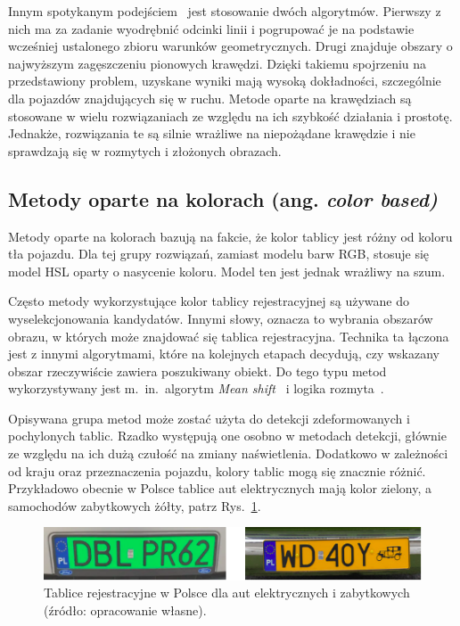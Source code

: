 Innym spotykanym podejściem~\cite{4410602} jest stosowanie dwóch algorytmów.
Pierwszy z nich ma za zadanie wyodrębnić odcinki linii i pogrupować je na podstawie wcześniej ustalonego zbioru warunków geometrycznych.
Drugi znajduje obszary o najwyższym zagęszczeniu pionowych krawędzi.
Dzięki takiemu spojrzeniu na przedstawiony problem, uzyskane wyniki mają wysoką dokładności, szczególnie dla pojazdów znajdujących się \linebreak w ruchu.
Metode oparte na krawędziach są stosowane w wielu rozwiązaniach ze względu na ich szybkość działania i prostotę.
Jednakże, rozwiązania te są silnie wrażliwe na niepożądane krawędzie i nie sprawdzają się w rozmytych i złożonych obrazach.

\subsection{Metody oparte na kolorach (ang. \textit{color based)}}
\label{subsec:color-based}
Metody oparte na kolorach bazują na fakcie, że kolor tablicy jest różny od koloru tła pojazdu.
Dla tej grupy rozwiązań, zamiast modelu barw RGB, stosuje się model HSL oparty o nasycenie koloru.
Model ten jest jednak wrażliwy na szum.

Często metody wykorzystujące kolor tablicy rejestracyjnej są używane do wyselekcjonowania kandydatów.
Innymi słowy, oznacza to wybrania obszarów obrazu, w których może znajdować się tablica rejestracyjna.
Technika ta łączona jest z innymi algorytmami, które na kolejnych etapach decydują, czy wskazany obszar rzeczywiście zawiera poszukiwany obiekt.
Do tego typu metod wykorzystywany jest m.\ in.\ algorytm \textit{Mean shift}~\cite{1520110} i logika rozmyta~\cite{Wang2008FuzzybasedAF}.

Opisywana grupa metod może zostać użyta do detekcji zdeformowanych i pochylonych tablic.
Rzadko występują one osobno w metodach detekcji, głównie ze względu na ich dużą czułość na zmiany naświetlenia.
Dodatkowo w zależności od kraju oraz przeznaczenia pojazdu, kolory tablic mogą się znacznie różnić.
Przykładowo obecnie w Polsce tablice aut elektrycznych mają kolor zielony, a samochodów zabytkowych żółty, patrz Rys.~\ref{fig:tablice}.
\FloatBarrier
\begin{figure}[!ht]
    \centering
    \includegraphics[scale=0.6]{Pictures/tablice}
    \caption{Tablice rejestracyjne w Polsce dla aut elektrycznych i zabytkowych (źródło: opracowanie własne).}
    \label{fig:tablice}
\end{figure}
\FloatBarrier

